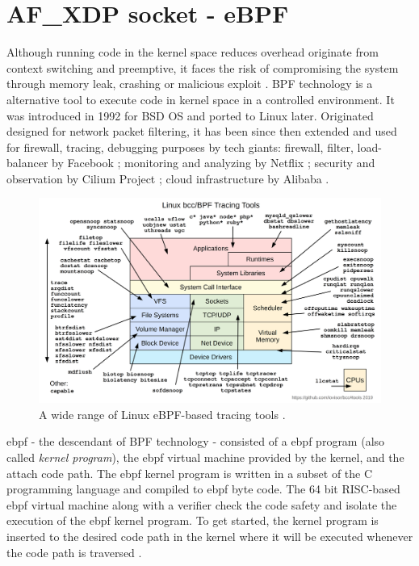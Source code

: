 \section{AF\_XDP socket - eBPF}
Although running code in the kernel space reduces overhead originate from context switching and preemptive, it faces the risk of compromising the system through memory leak, crashing or malicious exploit \cite{lwn_detect_kernel_mem_leak} \cite{emamdoost_detecting_2021}.
\ac{BPF} technology is a alternative tool to execute code in kernel space in a controlled environment.
It was introduced in 1992 for \ac{BSD} OS and ported to Linux later. 
Originated designed for network packet filtering, it has been since then extended and used for firewall, tracing, debugging purposes \cite{McCanne_intro_bpf} \cite{lwn_intro_ebpf} by tech giants: firewall, filter, load-balancer by Facebook \cite{facebook_katran_ebpf_2018}; monitoring and analyzing by Netflix \cite{netflix_network_insight}; security and observation by Cilium Project \cite{cilium_io_page}; cloud infrastructure by Alibaba \cite{alibaba_cloud_ebpf}.

\begin{figure}[H]
    \centering
    \includegraphics[width=1.0\textwidth]{resources/images/bcc_tracing_tools_2019.png}
    \caption{A wide range of Linux eBPF-based tracing tools \cite{iovisor_page}.}\label{fig:approach_design:tracing_tools_linux}
\end{figure}

\ac{ebpf} - the descendant of \ac{BPF} technology - consisted of a \ac{ebpf} program (also called \textit{kernel program}), the \ac{ebpf} virtual machine provided by the kernel, and the attach code path.
The \ac{ebpf} kernel program is written in a subset of the C programming language and compiled to \ac{ebpf} byte code.
The 64 bit \ac{RISC}-based \ac{ebpf} virtual machine along with a verifier check the code safety and isolate the execution of the \ac{ebpf} kernel program.
To get started, the kernel program is inserted to the desired code path in the kernel where it will be executed whenever the code path is traversed \cite{lwn_intro_ebpf}.

